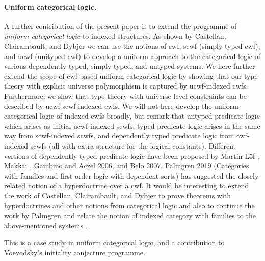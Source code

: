 \documentclass[11pt,a4paper]{article}
\theoremstyle{definition}
\begin{document}
\paragraph{Uniform categorical logic.} A further contribution of the present paper is to extend the programme of {\em uniform categorical logic} to indexed structures. As shown by Castellan, Clairambault, and Dybjer \cite{castellan:warsaw,CCD:lambek} we can use the notions of cwf, scwf (simply typed cwf), and ucwf (unityped cwf) to develop a uniform approach to the categorical logic of various dependently typed, simply typed, and untyped systems. We here further extend the scope of cwf-based uniform categorical logic by showing that our type theory with explicit universe polymorphism is captured by ucwf-indexed cwfs. Furthermore, we show that type theory with universe level constraints can be described by ucwf-scwf-indexed cwfs. We will not here develop the uniform categorical logic of indexed cwfs broadly, but remark that untyped predicate logic which arises as initial ucwf-indexed scwfs, typed predicate logic arises in the same way from scwf-indexed scwfs, and dependently typed predicate logic from cwf-indexed scwfs (all with extra structure for the logical constants). Different versions of dependently typed predicate logic have been proposed by Martin-Löf \cite{}, Makkai \cite{}, Gambino and Aczel 2006, and Belo 2007. Palmgren 2019 (Categories with families and first-order logic with dependent sorts) has suggested the closely related notion of a hyperdoctrine over a cwf. It would be interesting to extend the work of Castellan, Clairambault, and Dybjer \cite{castellan:warsaw,CCD:lambek} to prove theorems with hyperdoctrines and other notions from categorical logic and also to continue the work by Palmgren \cite{Palmgren19} and relate the notion of indexed category with families to the above-mentioned systems .

This is a case study in uniform categorical logic, and a contribution to Voevodsky's initiality conjecture programme.
\end{document}
